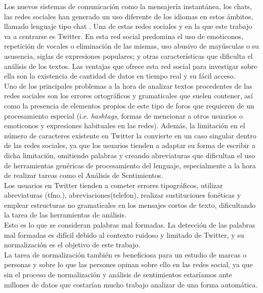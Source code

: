 \documentclass[spanish,12pt, a4paper,twoside]{paper}
\begin{document}
Los nuevos sistemas de comunicación como la mensajería instantánea, los chats, las redes sociales han generado un uso diferente de los idiomas en estos ámbitos, llamado lenguaje tipo chat \cite{forsyth:2007}. Una de estas redes sociales y en la que este trabajo va a centrarse es Twitter. En esta red social predomina el uso de emoticonos, repetición de vocales o eliminación de las mismas, uso abusivo de mayúsculas o su asusencia, siglas de expresiones populares; y otras características que dificulta el análisis de los textos. Las ventajas que ofrece esta red social para investigar sobre ella son la existencia  de cantidad de datos en tiempo real y su fácil acceso.\\

Uno de los principales problemas a la hora de analizar textos procedentes de las redes sociales son los errores ortográficos y gramaticales que suelen contener, así como la presencia de elementos propios de este tipo de foros que requieren de un procesamiento especial (i.e. \textit{hashtags}, formas de mencionar a otros usuarios o emoticonos y expresiones habituales en las redes). Además, la limitación en el número de caracteres existente en Twitter la convierte en un caso singular dentro de las redes sociales, ya que los usuarios tienden a adaptar su forma de escribir a dicha limitación, omitiendo palabras y creando abreviaturas que dificultan el uso de herramientas genéricas de procesamiento del lenguaje, especialmente a la hora de realizar tareas como el Análisis de Sentimientos.\\

Los usuarios en Twitter tienden a cometer errores tipográficos, utilizar abreviaturas (tfno.), abreviaciones(telefon), realizar sustituciones fonéticas y emplear estructuras no gramaticales en los mensajes cortos de texto, dificultando la tarea de las herramientas de análisis. \\

Esto es lo que se consideran palabras mal formadas. La detección de las palabras mal formadas es difícil debido al contexto ruidoso y limitado de Twitter, y su normalización es el objetivo de este trabajo. \\

La tarea de normalización también es beneficiosa para un estudio de marcas o personas y sobre lo que las persones opinan sobre ello en las redes social, ya que sin el proceso de normalización y análisis de sentimientos estaríamos ante millones de datos que costarían mucho trabajo analizar de una forma automática.
\end{document}
